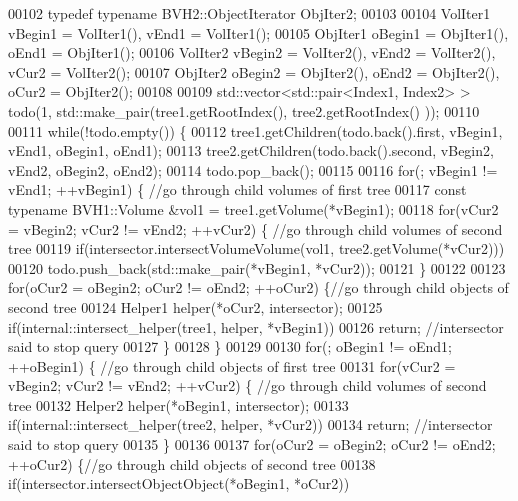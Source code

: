 \begin{DoxyCode}
00102   \textcolor{keyword}{typedef} \textcolor{keyword}{typename} BVH2::ObjectIterator ObjIter2;
00103 
00104   VolIter1 vBegin1 = VolIter1(), vEnd1 = VolIter1();
00105   ObjIter1 oBegin1 = ObjIter1(), oEnd1 = ObjIter1();
00106   VolIter2 vBegin2 = VolIter2(), vEnd2 = VolIter2(), vCur2 = VolIter2();
00107   ObjIter2 oBegin2 = ObjIter2(), oEnd2 = ObjIter2(), oCur2 = ObjIter2();
00108 
00109   std::vector<std::pair<Index1, Index2> > todo(1, std::make\_pair(tree1.getRootIndex(), tree2.getRootIndex()
      ));
00110 
00111   \textcolor{keywordflow}{while}(!todo.empty()) \{
00112     tree1.getChildren(todo.back().first, vBegin1, vEnd1, oBegin1, oEnd1);
00113     tree2.getChildren(todo.back().second, vBegin2, vEnd2, oBegin2, oEnd2);
00114     todo.pop\_back();
00115 
00116     \textcolor{keywordflow}{for}(; vBegin1 != vEnd1; ++vBegin1) \{ \textcolor{comment}{//go through child volumes of first tree}
00117       \textcolor{keyword}{const} \textcolor{keyword}{typename} BVH1::Volume &vol1 = tree1.getVolume(*vBegin1);
00118       \textcolor{keywordflow}{for}(vCur2 = vBegin2; vCur2 != vEnd2; ++vCur2) \{ \textcolor{comment}{//go through child volumes of second tree}
00119         \textcolor{keywordflow}{if}(intersector.intersectVolumeVolume(vol1, tree2.getVolume(*vCur2)))
00120           todo.push\_back(std::make\_pair(*vBegin1, *vCur2));
00121       \}
00122 
00123       \textcolor{keywordflow}{for}(oCur2 = oBegin2; oCur2 != oEnd2; ++oCur2) \{\textcolor{comment}{//go through child objects of second tree}
00124         Helper1 helper(*oCur2, intersector);
00125         \textcolor{keywordflow}{if}(internal::intersect\_helper(tree1, helper, *vBegin1))
00126           \textcolor{keywordflow}{return}; \textcolor{comment}{//intersector said to stop query}
00127       \}
00128     \}
00129 
00130     \textcolor{keywordflow}{for}(; oBegin1 != oEnd1; ++oBegin1) \{ \textcolor{comment}{//go through child objects of first tree}
00131       \textcolor{keywordflow}{for}(vCur2 = vBegin2; vCur2 != vEnd2; ++vCur2) \{ \textcolor{comment}{//go through child volumes of second tree}
00132         Helper2 helper(*oBegin1, intersector);
00133         \textcolor{keywordflow}{if}(internal::intersect\_helper(tree2, helper, *vCur2))
00134           \textcolor{keywordflow}{return}; \textcolor{comment}{//intersector said to stop query}
00135       \}
00136 
00137       \textcolor{keywordflow}{for}(oCur2 = oBegin2; oCur2 != oEnd2; ++oCur2) \{\textcolor{comment}{//go through child objects of second tree}
00138         \textcolor{keywordflow}{if}(intersector.intersectObjectObject(*oBegin1, *oCur2))

\end{DoxyCode}
